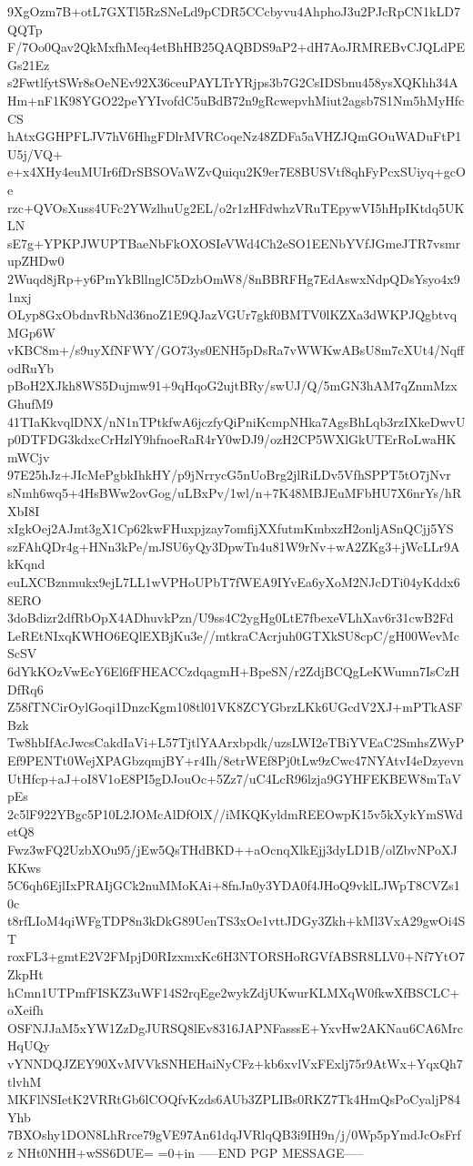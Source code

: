 9XgOzm7B+otL7GXTl5RzSNeLd9pCDR5CCcbyvu4AhphoJ3u2PJcRpCN1kLD7QQTp
F/7Oo0Qav2QkMxfhMeq4etBhHB25QAQBDS9aP2+dH7AoJRMREBvCJQLdPEGs21Ez
s2FwtlfytSWr8sOeNEv92X36ceuPAYLTrYRjps3b7G2CsIDSbnu458ysXQKhh34A
Hm+nF1K98YGO22peYYIvofdC5uBdB72n9gRcwepvhMiut2agsb7S1Nm5hMyHfcCS
hAtxGGHPFLJV7hV6HhgFDlrMVRCoqeNz48ZDFa5aVHZJQmGOuWADuFtP1U5j/VQ+
e+x4XHy4euMUIr6fDrSBSOVaWZvQuiqu2K9er7E8BUSVtf8qhFyPcxSUiyq+gcOe
rzc+QVOsXuss4UFc2YWzlhuUg2EL/o2r1zHFdwhzVRuTEpywVI5hHpIKtdq5UKLN
sE7g+YPKPJWUPTBaeNbFkOXOSIeVWd4Ch2eSO1EENbYVfJGmeJTR7vsmrupZHDw0
2Wuqd8jRp+y6PmYkBllnglC5DzbOmW8/8nBBRFHg7EdAswxNdpQDsYsyo4x91nxj
OLyp8GxObdnvRbNd36noZ1E9QJazVGUr7gkf0BMTV0lKZXa3dWKPJQgbtvqMGp6W
vKBC8m+/s9uyXfNFWY/GO73ys0ENH5pDsRa7vWWKwABsU8m7cXUt4/NqffodRuYb
pBoH2XJkh8WS5Dujmw91+9qHqoG2ujtBRy/swUJ/Q/5mGN3hAM7qZnmMzxGhufM9
41TIaKkvqlDNX/nN1nTPtkfwA6jczfyQiPniKcmpNHka7AgsBhLqb3rzIXkeDwvU
p0DTFDG3kdxcCrHzlY9hfnoeRaR4rY0wDJ9/ozH2CP5WXlGkUTErRoLwaHKmWCjv
97E25hJz+JIcMePgbkIhkHY/p9jNrrycG5nUoBrg2jlRiLDv5VfhSPPT5tO7jNvr
sNmh6wq5+4HsBWw2ovGog/uLBxPv/1wl/n+7K48MBJEuMFbHU7X6nrYs/hRXbI8I
xIgkOej2AJmt3gX1Cp62kwFHuxpjzay7omfijXXfutmKmbxzH2onljASnQCjj5YS
szFAhQDr4g+HNn3kPe/mJSU6yQy3DpwTn4u81W9rNv+wA2ZKg3+jWcLLr9AkKqnd
euLXCBznmukx9ejL7LL1wVPHoUPbT7fWEA9IYvEa6yXoM2NJcDTi04yKddx68ERO
3doBdizr2dfRbOpX4ADhuvkPzn/U9ss4C2ygHg0LtE7fbexeVLhXav6r31cwB2Fd
LeREtNIxqKWHO6EQlEXBjKu3e//mtkraCAcrjuh0GTXkSU8cpC/gH00WevMcScSV
6dYkKOzVwEcY6El6fFHEACCzdqagmH+BpeSN/r2ZdjBCQgLeKWumn7IsCzHDfRq6
Z58fTNCirOylGoqi1DnzcKgm108tl01VK8ZCYGbrzLKk6UGcdV2XJ+mPTkASFBzk
Tw8hbIfAcJwcsCakdIaVi+L57TjtlYAArxbpdk/uzsLWI2eTBiYVEaC2SmhsZWyP
Ef9PENTt0WejXPAGbzqmjBY+r4Ih/8etrWEf8Pj0tLw9zCwc47NYAtvI4eDzyevn
UtHfcp+aJ+oI8V1oE8PI5gDJouOc+5Zz7/uC4LcR96lzja9GYHFEKBEW8mTaVpEs
2c5lF922YBgc5P10L2JOMcAlDfOlX//iMKQKyldmREEOwpK15v5kXykYmSWdetQ8
Fwz3wFQ2UzbXOu95/jEw5QsTHdBKD++aOcnqXlkEjj3dyLD1B/olZbvNPoXJKKws
5C6qh6EjlIxPRAIjGCk2nuMMoKAi+8fnJn0y3YDA0f4JHoQ9vklLJWpT8CVZs10c
t8rfLIoM4qiWFgTDP8n3kDkG89UenTS3xOe1vttJDGy3Zkh+kMl3VxA29gwOi4ST
roxFL3+gmtE2V2FMpjD0RIzxmxKc6H3NTORSHoRGVfABSR8LLV0+Nf7YtO7ZkpHt
hCmn1UTPmfFISKZ3uWF14S2rqEge2wykZdjUKwurKLMXqW0fkwXfBSCLC+oXeifh
OSFNJJaM5xYW1ZzDgJURSQ8lEv8316JAPNFasssE+YxvHw2AKNau6CA6MrcHqUQy
vYNNDQJZEY90XvMVVkSNHEHaiNyCFz+kb6xvlVxFExlj75r9AtWx+YqxQh7tlvhM
MKFlNSIetK2VRRtGb6lCOQfvKzds6AUb3ZPLIBs0RKZ7Tk4HmQsPoCyaljP84Yhb
7BXOshy1DON8LhRrce79gVE97An61dqJVRlqQB3i9IH9n/j/0Wp5pYmdJcOsFrfz
NHt0NHH+wSS6DUE=
=0+in
-----END PGP MESSAGE-----
